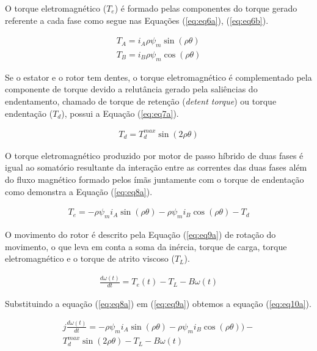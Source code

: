 O torque eletromagnético ($T_e$) é formado pelas componentes do torque gerado referente a cada fase como segue nas Equações (\ref{eq:eq6a}), (\ref{eq:eq6b}).

\begin{eqnarray}
\label{eq:eq6a}
T_A = i_A \rho \psi_m \sin(\rho \theta)\\
\label{eq:eq6b}
T_B = i_B \rho \psi_m \cos(\rho \theta) 
\end{eqnarray}

Se o estator e o rotor tem dentes, o torque eletromagnético é complementado pela componente de torque devido a relutância gerado pela saliências do endentamento, chamado de torque de retenção (\textit{detent torque}) ou torque endentação ($T_d$), possui a Equação (\ref{eq:eq7a}).

\begin{eqnarray}
\label{eq:eq7a}
T_d = T_{d}^{max}\sin(2 \rho \theta)
\end{eqnarray}

O torque eletromagnético produzido por motor de passo híbrido de duas fases é igual ao somatório resultante da interação entre as correntes das duas fases além do fluxo magnético formado pelos ímãs juntamente com o torque de endentação como demonstra a Equação (\ref{eq:eq8a}).

\begin{eqnarray}
	\label{eq:eq8a}
	T_e = - \rho \psi_m i_A \sin(\rho \theta) - \rho \psi_m i_B \cos(\rho \theta ) - T_d
\end{eqnarray}

O movimento do rotor é descrito pela Equação (\ref{eq:eq9a}) de rotação do movimento, o que leva em conta a soma da inércia, torque de carga, torque eletromagnético e o torque de atrito viscoso ($T_L$).

\begin{eqnarray}
\label{eq:eq9a}
\frac{d\omega(t)}{dt} = T_e(t) - T_L - B\omega(t)
\end{eqnarray}

Substituindo a equação (\ref{eq:eq8a}) em (\ref{eq:eq9a}) obtemos a equação (\ref{eq:eq10a}).


\begin{eqnarray}
\label{eq:eq10a}
j\frac{d\omega(t)}{dt} = - \rho \psi_m i_A \sin(\rho \theta) - \rho \psi_m i_B \cos(\rho \theta ) )-\\ \nonumber T_{d}^{max}\sin(2 \rho \theta)  - T_L - B\omega(t)
\end{eqnarray}


